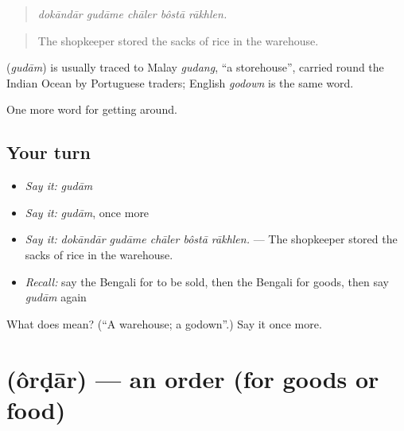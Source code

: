 \begin{quote}
    
\end{quote}

\begin{quote}
\emph{dokāndār gudāme chāler bôstā rākhlen.}
\end{quote}

\begin{quote}
The shopkeeper stored the sacks of rice in the warehouse.
\end{quote}

\begin{cousinweb}
\textbf{} (\emph{gudām}) is usually traced to Malay \emph{gudang}, \textquotedblleft{}a storehouse\textquotedblright{}, carried round the Indian Ocean by Portuguese traders; English \emph{godown} is the same word.
\end{cousinweb}

\begin{grammarlens}[title={What you've built}]
One more word for getting around.
\end{grammarlens}

\subsection*{Your turn}
\begin{itemize}
\raggedright
  \item \emph{Say it:} \emph{gudām}
  \item \emph{Say it:} \emph{gudām}, once more
  \item \emph{Say it:} \emph{dokāndār gudāme chāler bôstā rākhlen.} — The shopkeeper stored the sacks of rice in the warehouse.
  \item \emph{Recall:} say the Bengali for to be sold, then the Bengali for goods, then say \emph{gudām} again
\end{itemize}

\begin{tcolorbox}[breakable,colback=teal!4,colframe=teal!35!black,title={Before you move on}]
What does  mean? (\textquotedblleft{}A warehouse; a godown\textquotedblright{}.) Say it once more.
\end{tcolorbox}
\section[\texorpdfstring{\bn{অর্ডার} (ôrḍār)}{অর্ডার (ôrḍār)}]{ (ôrḍār) — an order (for goods or food)}

